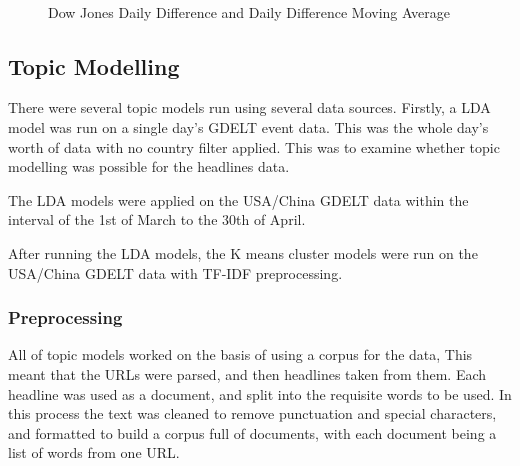 \begin{figure}[H]
	\centering
	\\
	\caption{Dow Jones Daily Difference and Daily Difference Moving Average}
	\label{fig:dow_diff}
\end{figure}


\subsection{Topic Modelling}
There were several topic models run using several data sources. Firstly, a LDA model was run on a single day's GDELT event data. This was the whole day's worth of data with no country filter applied. This was to examine whether topic modelling was possible for the headlines data.  

The LDA models were applied on the USA/China GDELT data within the interval of the 1st of March to the 30th of April. 

After running the LDA models, the K means cluster models were run on the USA/China GDELT data with TF-IDF preprocessing.

\subsubsection{Preprocessing}
All of topic models worked on the basis of using a corpus for the data, This meant that the URLs were parsed, and then headlines taken from them. Each headline was used as a document, and split into the requisite words to be used. In this process the text was cleaned to remove punctuation and special characters, and formatted to build a corpus full of documents, with each document being a list of words from one URL. 
